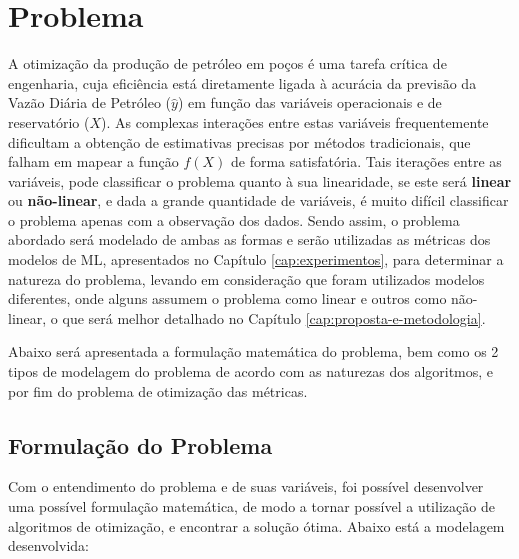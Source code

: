 \chapter{Problema}
\label{cap:problema}

A otimização da produção de petróleo em poços é uma tarefa crítica de engenharia, cuja eficiência está diretamente ligada à acurácia da previsão da Vazão Diária de Petróleo ($\hat{y}$) em função das variáveis operacionais e de reservatório ($X$). As complexas interações entre estas variáveis frequentemente dificultam a obtenção de estimativas precisas por métodos tradicionais, que falham em mapear a função $f(X)$ de forma satisfatória. Tais iterações entre as variáveis, pode classificar o problema quanto à sua linearidade, se este será \textbf{linear} ou \textbf{não-linear}, e dada a grande quantidade de variáveis, é muito difícil classificar o problema apenas com a observação dos dados. Sendo assim, o problema abordado será modelado de ambas as formas e serão utilizadas as métricas dos modelos de \gls{ML}, apresentados no Capítulo \ref{cap:experimentos}, para determinar a natureza do problema, levando em consideração que foram utilizados modelos diferentes, onde alguns assumem o problema como linear e outros como não-linear, o que será melhor detalhado no Capítulo \ref{cap:proposta-e-metodologia}.

Abaixo será apresentada a formulação matemática do problema, bem como os 2 tipos de modelagem do problema de acordo com as naturezas dos algoritmos, e por fim do problema de otimização das métricas.

\section{Formulação do Problema}
\label{subsec:formulacao}

Com o entendimento do problema e de suas variáveis, foi possível desenvolver uma possível formulação matemática, de modo a tornar possível a utilização de algoritmos de otimização, e encontrar a solução ótima. Abaixo está a modelagem desenvolvida:

